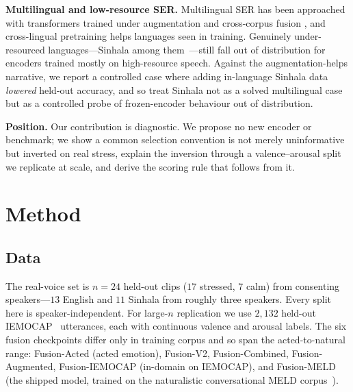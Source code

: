 \documentclass[conference]{IEEEtran}
\begin{document}
\textbf{Multilingual and low-resource SER.} Multilingual SER has been approached
with transformers trained under augmentation and cross-corpus fusion
\cite{multiling_ser}, and cross-lingual pretraining helps languages seen in
training. Genuinely under-resourced languages---Sinhala among
them~\cite{sinhala_openslr}---still fall out of distribution for encoders trained
mostly on high-resource speech. Against the augmentation-helps narrative, we report
a controlled case where adding in-language Sinhala data \emph{lowered} held-out
accuracy, and so treat Sinhala not as a solved multilingual case but as a
controlled probe of frozen-encoder behaviour out of distribution.

\textbf{Position.} Our contribution is diagnostic. We propose no new encoder or
benchmark; we show a common selection convention is not merely uninformative but
inverted on real stress, explain the inversion through a valence--arousal split we
replicate at scale, and derive the scoring rule that follows from it.

\section{Method}

\subsection{Data}
The real-voice set is $n = 24$ held-out clips ($17$ stressed, $7$ calm) from
consenting speakers---$13$ English and $11$ Sinhala from roughly three speakers.
Every split here is speaker-independent. For large-$n$ replication we use $2{,}132$
held-out IEMOCAP~\cite{iemocap} utterances, each with continuous valence and
arousal labels. The six fusion checkpoints differ only in training corpus and so
span the acted-to-natural range: Fusion-Acted (acted emotion), Fusion-V2,
Fusion-Combined, Fusion-Augmented, Fusion-IEMOCAP (in-domain on IEMOCAP), and
Fusion-MELD (the shipped model, trained on the naturalistic conversational MELD
corpus~\cite{meld}).
\end{document}
